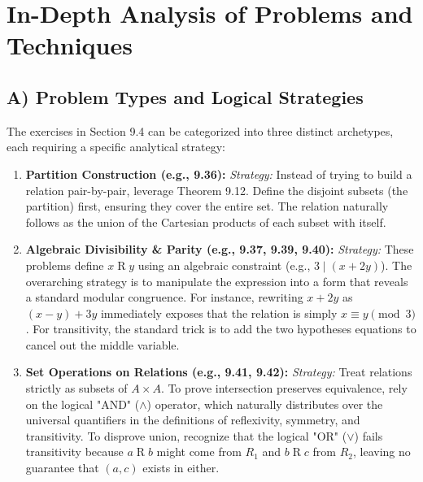 \documentclass[11pt, a4paper]{article}
\theoremstyle{definition}
\theoremstyle{remark}
\begin{document}
\newpage
\section{In-Depth Analysis of Problems and Techniques}

\subsection{A) Problem Types and Logical Strategies}
The exercises in Section 9.4 can be categorized into three distinct archetypes, each requiring a specific analytical strategy:

\begin{enumerate}
    \item \textbf{Partition Construction (e.g., 9.36):} 
    \textit{Strategy:} Instead of trying to build a relation pair-by-pair, leverage Theorem 9.12. Define the disjoint subsets (the partition) first, ensuring they cover the entire set. The relation naturally follows as the union of the Cartesian products of each subset with itself.
    
    \item \textbf{Algebraic Divisibility \& Parity (e.g., 9.37, 9.39, 9.40):}
    \textit{Strategy:} These problems define $x \mathrel{R} y$ using an algebraic constraint (e.g., $3 \mid (x+2y)$). The overarching strategy is to manipulate the expression into a form that reveals a standard modular congruence. For instance, rewriting $x + 2y$ as $(x - y) + 3y$ immediately exposes that the relation is simply $x \equiv y \pmod 3$. For transitivity, the standard trick is to add the two hypotheses equations to cancel out the middle variable.
    
    \item \textbf{Set Operations on Relations (e.g., 9.41, 9.42):}
    \textit{Strategy:} Treat relations strictly as subsets of $A \times A$. To prove intersection preserves equivalence, rely on the logical "AND" ($\land$) operator, which naturally distributes over the universal quantifiers in the definitions of reflexivity, symmetry, and transitivity. To disprove union, recognize that the logical "OR" ($\lor$) fails transitivity because $a \mathrel{R} b$ might come from $R_1$ and $b \mathrel{R} c$ from $R_2$, leaving no guarantee that $(a, c)$ exists in either.
\end{enumerate}
\end{document}
